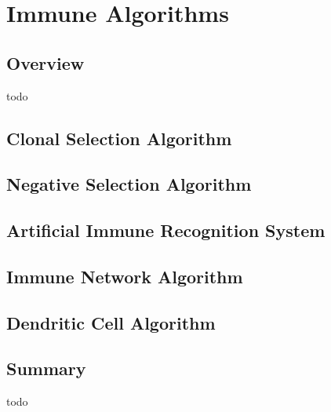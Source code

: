 


\chapter{Immune Algorithms}
\label{ch:immune}

\section{Overview}
todo

\section{Clonal Selection Algorithm}
\section{Negative Selection Algorithm}
\section{Artificial Immune Recognition System}
\section{Immune Network Algorithm}
\section{Dendritic Cell Algorithm}

\section{Summary}
todo
